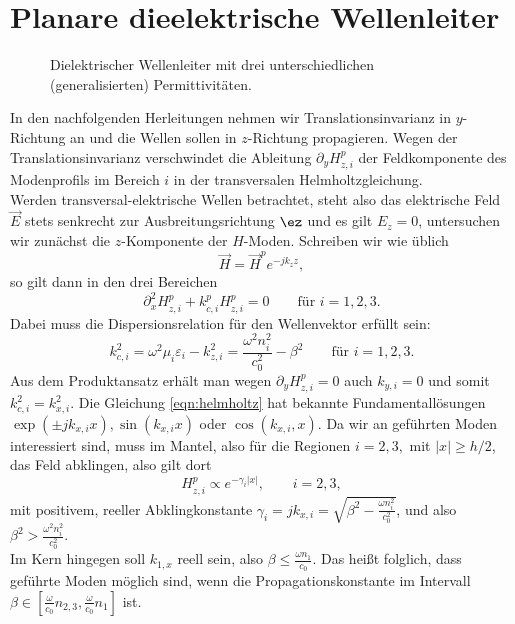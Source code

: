 \documentclass[main.tex]{subfiles}
\begin{document}
\chapter{Planare dieelektrische Wellenleiter}
\begin{figure}[h!]
    \centering
    
    \caption{Dielektrischer Wellenleiter mit drei unterschiedlichen (generalisierten) Permittivitäten.}
    \label{fig:skizze1}
\end{figure}

In den nachfolgenden Herleitungen nehmen wir Translationsinvarianz in $y$-Richtung an und die Wellen sollen in $z$-Richtung propagieren. Wegen der Translationsinvarianz verschwindet die Ableitung $∂_y H_{z,i}^p$ der Feldkomponente des Modenprofils im Bereich $i$ in der transversalen Helmholtzgleichung. \\
Werden transversal-elektrische Wellen betrachtet, steht also das elektrische Feld $\vec E$ stets senkrecht zur Ausbreitungsrichtung $\ez$ und es gilt $E_z = 0$, untersuchen wir zunächst die $z$-Komponente der $H$-Moden. Schreiben wir wie üblich
$$\vec H = \vec H^p e^{-jk_z z},$$
so gilt dann in den drei Bereichen
\begin{equation}
    \label{eqn:helmholtz}
    ∂_x^2 H_{z,i}^p + k_{c,i}^p H_{z,i}^p = 0 \qquad\text{für $i=1,2,3.$}
\end{equation}
Dabei muss die Dispersionsrelation für den Wellenvektor erfüllt sein:
\begin{equation}
    \label{eqn:dispersion}
    k_{c,i}^2 = ω^2 μ_i ε_i - k_{z,i}^2 = \frac{ω^2 n_i^2}{c_0^2} - β^2 \qquad\text{für $i=1,2,3$.}
\end{equation}
Aus dem Produktansatz erhält man wegen $∂_y H_{z,i}^p = 0$ auch $k_{y,i} = 0$ und somit $k_{c,i}^2 = k_{x,i}^2$.
Die Gleichung \eqref{eqn:helmholtz} hat bekannte Fundamentallösungen $\exp \left( \pm jk_{x,i} x\right), \sin(k_{x,i} x)$ oder $\cos(k_{x,i},x)$. Da wir an geführten Moden interessiert sind, muss im Mantel, also für die Regionen $i=2,3,$ mit $|x|\ge h/2$, das Feld abklingen, also gilt dort
$$H_{z,i}^p ∝ e^{-γ_i |x|}, \qquad i=2,3,$$
mit positivem, reeller Abklingkonstante $γ_i = jk_{x,i} = \sqrt{β^2 - \frac{ω n_i^2}{c_0^2}}$, und also $β^2 > \frac{ω^2 n_i^2}{c_0^2}.$\\
Im Kern hingegen soll $k_{1,x}$ reell sein, also $β\le \frac{ωn_1}{c_0}.$ Das heißt folglich, dass geführte Moden möglich sind, wenn die Propagationskonstante im Intervall $β \in \left[ \frac{ω}{c_0} n_{2,3}, \frac{ω}{c_0} n_1 \right]$ ist.
\end{document}
